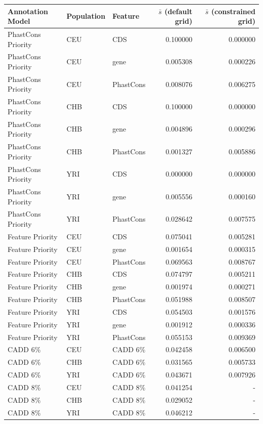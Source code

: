 \documentclass[11pt]{article}
\begin{document}
\begin{tabular}{|l|llrr|}
\hline
Annotation Model &  Population &    Feature &   ${\bar{s}}$ (default grid) & ${\bar{s}}$ (constrained grid) \\
\hline
 PhastCons Priority &  CEU &        CDS &  0.100000 &  0.000000 \\
 PhastCons Priority &  CEU &       gene &  0.005308 &  0.000226 \\
 PhastCons Priority &  CEU &  PhastCons &  0.008076 &  0.006275 \\
 PhastCons Priority &  CHB &        CDS &  0.100000 &  0.000000 \\
 PhastCons Priority &  CHB &       gene &  0.004896 &  0.000296 \\
 PhastCons Priority &  CHB &  PhastCons &  0.001327 &  0.005886 \\
 PhastCons Priority &  YRI &        CDS &  0.000000 &  0.000000 \\
 PhastCons Priority &  YRI &       gene &  0.005556 &  0.000160 \\
 PhastCons Priority &  YRI &  PhastCons &  0.028642 &  0.007575 \\
   Feature Priority &  CEU &        CDS &  0.075041 &  0.005281 \\
   Feature Priority &  CEU &       gene &  0.001654 &  0.000315 \\
   Feature Priority &  CEU &  PhastCons &  0.069563 &  0.008767 \\
   Feature Priority &  CHB &        CDS &  0.074797 &  0.005211 \\
   Feature Priority &  CHB &       gene &  0.001974 &  0.000271 \\
   Feature Priority &  CHB &  PhastCons &  0.051988 &  0.008507 \\
   Feature Priority &  YRI &        CDS &  0.054503 &  0.001576 \\
   Feature Priority &  YRI &       gene &  0.001912 &  0.000336 \\
   Feature Priority &  YRI &  PhastCons &  0.055153 &  0.009369 \\
            CADD 6\% &  CEU &      CADD 6\% &  0.042458 &  0.006500 \\
            CADD 6\% &  CHB &      CADD 6\% &  0.031565 &  0.005733 \\
            CADD 6\% &  YRI &      CADD 6\% &  0.043671 &  0.007926 \\
            CADD 8\% &  CEU &      CADD 8\% &  0.041254 &       - \\
            CADD 8\% &  CHB &      CADD 8\% &  0.029052 &       - \\
            CADD 8\% &  YRI &      CADD 8\% &  0.046212 &       - \\
\hline
\end{tabular}
\end{document}
